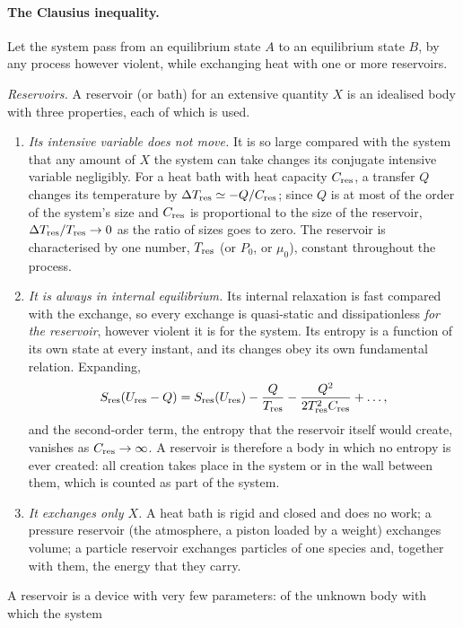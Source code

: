\documentclass[10pt,a4paper]{article}
\theoremstyle{remark}
\begin{document}
\paragraph{The Clausius inequality.} Let the system pass from an equilibrium
state $A$ to an equilibrium state $B$, by any process however violent, while
exchanging heat with one or more reservoirs.

\emph{Reservoirs.} A reservoir (or bath) for an extensive quantity $X$ is an
idealised body with three properties, each of which is used.
\begin{enumerate}[label=(\roman*)]
\item \emph{Its intensive variable does not move.} It is so large compared
  with the system that any amount of $X$ the system can take changes its
  conjugate intensive variable negligibly. For a heat bath with heat capacity
  $C_{\rm res}$, a transfer $Q$ changes its temperature by
  $\Delta T_{\rm res}\simeq-Q/C_{\rm res}$; since $Q$ is at most of the order of
  the system's size and $C_{\rm res}$ is proportional to the size of the
  reservoir, $\Delta T_{\rm res}/T_{\rm res}\to0$ as the ratio of sizes goes to
  zero. The reservoir is characterised by one number, $T_{\rm res}$ (or $P_0$,
  or $\mu_0$), constant throughout the process.
\item \emph{It is always in internal equilibrium.} Its internal relaxation is
  fast compared with the exchange, so every exchange is quasi-static and
  dissipationless \emph{for the reservoir}, however violent it is for the
  system. Its entropy is a function of its own state at every instant, and
  its changes obey its own fundamental relation. Expanding,
  \[
    S_{\rm res}(U_{\rm res}-Q)=S_{\rm res}(U_{\rm res})-\frac{Q}{T_{\rm res}}
    -\frac{Q^{2}}{2T_{\rm res}^{2}C_{\rm res}}+\dots ,
  \]
  and the second-order term, the entropy that the reservoir itself would
  create, vanishes as $C_{\rm res}\to\infty$. A reservoir is therefore a body in
  which no entropy is ever created: all creation takes place in the system or
  in the wall between them, which is counted as part of the system.
\item \emph{It exchanges only $X$.} A heat bath is rigid and closed and does
  no work; a pressure reservoir (the atmosphere, a piston loaded by a weight)
  exchanges volume; a particle reservoir exchanges particles of one species
  and, together with them, the energy that they carry.
\end{enumerate}
A reservoir is a device with very few parameters: of the unknown body with which the system
\end{document}
